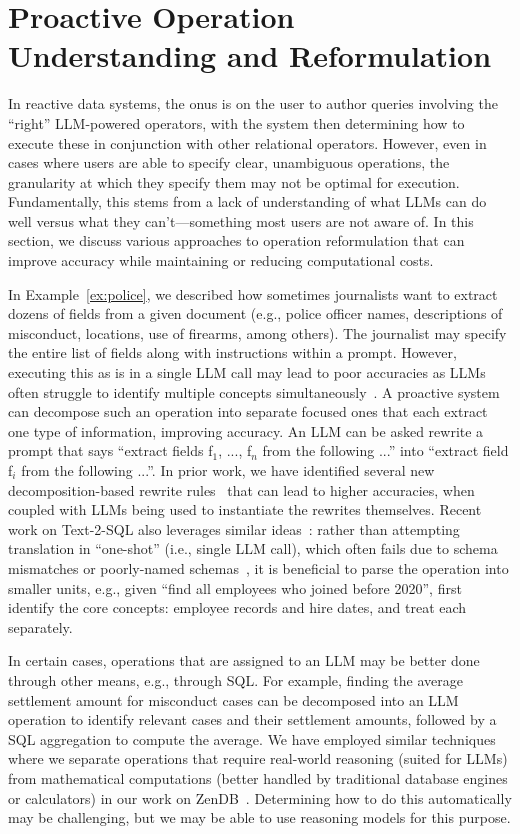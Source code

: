 

\section{Proactive Operation Understanding and Reformulation}
In reactive data systems, the onus
is on the user to author queries involving
the ``right'' LLM-powered operators,
with the system then determining how to execute
these in conjunction with other relational operators.
However, even in cases where users
are able to specify clear, unambiguous operations,
the granularity at which they specify them may
not be optimal for execution.
Fundamentally, this stems from a lack
of understanding of what LLMs can do well
versus what they can't---something most users
are not aware of.
In this section, we discuss various 
approaches to 
operation reformulation 
that can improve accuracy 
while maintaining or reducing computational costs.

In Example~\ref{ex:police}, we described
how sometimes journalists want to extract
dozens of fields from a given document
(e.g., police officer names, descriptions
of misconduct, locations, use of firearms, among others).
The journalist may specify the entire list of fields
along with instructions within a prompt.
However, executing this as is in a single LLM call
may lead to poor accuracies
as LLMs often struggle to identify multiple concepts simultaneously~\cite{shankar2024docetl}.
A proactive system can decompose such an operation
into separate focused ones that
each extract one type of information, improving
accuracy.
An LLM can be asked rewrite a prompt that
says ``extract fields f$_1$, ..., f$_n$ from the following ...''
into ``extract field f$_i$ from the following ...''.
In prior work, we have identified
several new decomposition-based rewrite rules~\cite{shankar2024docetl}
that can lead to higher accuracies,
when coupled with LLMs being used to instantiate
the rewrites themselves.
Recent work on Text-2-SQL also leverages 
similar ideas~\cite{pourreza2024chase}: 
rather than attempting translation 
in ``one-shot'' (i.e., single LLM call), 
which often fails due to schema mismatches 
or poorly-named schemas~\cite{luoma2025snails}, 
it is beneficial to 
parse the operation into smaller units, e.g.,
given ``find all employees who joined before 2020'', 
first identify the core concepts: employee records 
and hire dates,
and treat each separately.

In certain cases, operations
that are assigned to an LLM may be better done
through other means, e.g., through SQL.
For example, finding the average settlement amount 
for misconduct cases can be decomposed 
into an LLM operation to 
identify relevant cases and their settlement amounts, 
followed by a SQL aggregation to compute the average.
We have employed similar techniques where
we separate operations that require real-world reasoning (suited for LLMs) from mathematical computations (better handled by traditional database engines or calculators) in
our work on ZenDB~\cite{lin2024towards}.
Determining how to do this automatically
may be challenging, but we may be able to use 
reasoning models for this purpose. 

